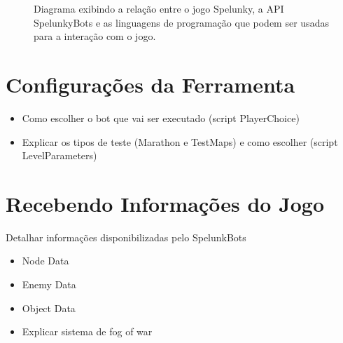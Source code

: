 \begin{figure}[htb!]
\centering
{}
\caption {\label{fig:spelunkbots-usage-diagram}Diagrama exibindo a relação
entre o jogo Spelunky, a API SpelunkyBots e as linguagens de programação que
podem ser usadas para a interação com o jogo.}
\end{figure}


\section{Configurações da Ferramenta}
\begin{mdframed}[backgroundcolor=green!20]
\begin{itemize}
    \item
		Como escolher o bot que vai ser executado (script PlayerChoice)
    \item
		Explicar os tipos de teste (Marathon e TestMaps) e como escolher
		(script LevelParameters)
\end{itemize}
\end{mdframed}


\section{Recebendo Informações do Jogo}
\begin{mdframed}[backgroundcolor=green!20]
Detalhar informações disponibilizadas pelo SpelunkBots
\begin{itemize}
    \item
		Node Data
	\item
		Enemy Data
	\item
		Object Data
	\item
		Explicar sistema de fog of war
\end{itemize}
\end{mdframed}



